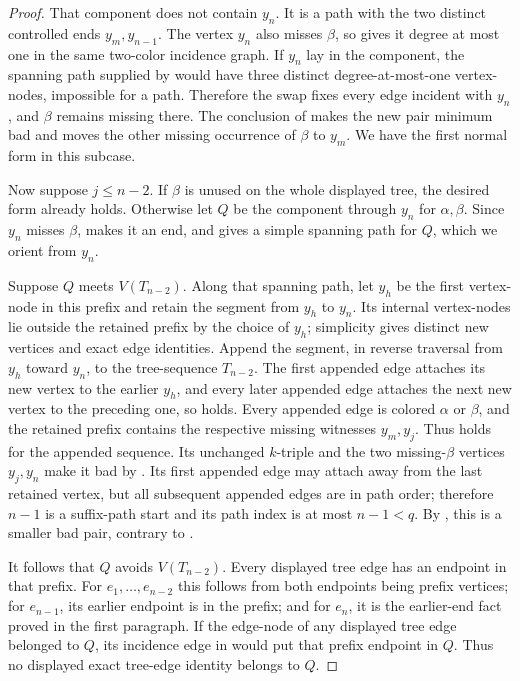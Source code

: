 \begin{proof}
That component does not contain \(y_n\).  It is a path with the two
distinct controlled ends \(y_m,y_{n-1}\).  The vertex \(y_n\) also
misses \(\beta\), so  gives it
degree at most one in the same two-color incidence graph.  If \(y_n\)
lay in the component, the spanning path supplied by
 would have three distinct
degree-at-most-one vertex-nodes, impossible for a path.  Therefore the
swap fixes every edge incident with \(y_n\), and \(\beta\) remains
missing there.  The conclusion of
 makes the new pair minimum bad
and moves the other missing occurrence of \(\beta\) to \(y_m\).  We have
the first normal form in this subcase.

Now suppose \(j\le n-2\).  If \(\beta\) is unused on the whole displayed
tree, the desired form already holds.  Otherwise let \(Q\) be the
component  through \(y_n\) for
\(\alpha,\beta\).  Since \(y_n\) misses \(\beta\),
 makes it an end, and
 gives a simple spanning path for
\(Q\), which we orient from \(y_n\).

Suppose \(Q\) meets \(V(T_{n-2})\).  Along that spanning path, let \(y_h\)
be the first vertex-node in this prefix and retain the segment from
\(y_h\) to \(y_n\).  Its internal vertex-nodes lie outside the retained
prefix by the choice of \(y_h\); simplicity gives distinct new vertices
and exact edge identities.  Append the segment, in reverse traversal from
\(y_h\) toward \(y_n\), to the tree-sequence \(T_{n-2}\).  The first
appended edge attaches its new vertex to the earlier \(y_h\), and every
later appended edge attaches the next new vertex to the preceding one, so
 holds.  Every appended edge is colored
\(\alpha\) or \(\beta\), and the retained prefix contains the respective
missing witnesses \(y_m,y_j\).  Thus
 holds for the appended sequence.  Its unchanged
\(k\)-triple and the two missing-\(\beta\) vertices \(y_j,y_n\) make it
bad by .  Its first appended edge may attach
away from the last retained vertex, but all subsequent appended edges are
in path order; therefore \(n-1\) is a suffix-path start and its path
index is at most \(n-1<q\).  By , this is a
smaller bad pair, contrary to .

It follows that \(Q\) avoids \(V(T_{n-2})\).  Every displayed tree edge
has an endpoint in that prefix.  For \(e_1,\ldots,e_{n-2}\) this follows
from both endpoints being prefix vertices; for \(e_{n-1}\), its earlier
endpoint is in the prefix; and for \(e_n\), it is the earlier-end fact
proved in the first paragraph.  If the edge-node of any displayed tree
edge belonged to \(Q\), its incidence edge in
 would put that prefix endpoint in \(Q\).
Thus no displayed exact tree-edge identity belongs to \(Q\).


\end{proof}
